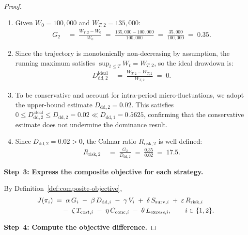 \documentclass[12pt,openany]{book}
\numberwithin{equation}{chapter}
\theoremstyle{plain}
\theoremstyle{definition}
\theoremstyle{remark}
\numberwithin{equation}{chapter}
\theoremstyle{plain}
\begin{document}
\begin{proof}
\begin{enumerate}
  \item Given $W_0 = 100{,}000$ and $W_{T,2} = 135{,}000$:
        \begin{align}
          G_2
          &\;=\; \frac{W_{T,2} - W_0}{W_0}
           \;=\; \frac{135{,}000 - 100{,}000}{100{,}000}
           \;=\; \frac{35{,}000}{100{,}000}
           \;=\; 0.35.
        \end{align}
  \item Since the trajectory is monotonically non-decreasing by
        assumption, the running maximum satisfies
        $\sup_{t \leq T} W_t = W_{T,2}$, so the ideal drawdown is:
        \begin{align}
          D_{\mathrm{dd},2}^{\mathrm{ideal}}
          &\;=\; \frac{W_{T,2} - W_{T,2}}{W_{T,2}}
           \;=\; 0.
        \end{align}
  \item To be conservative and account for intra-period micro-fluctuations,
        we adopt the upper-bound estimate $D_{\mathrm{dd},2} = 0.02$.
        This satisfies $0 \leq D_{\mathrm{dd},2}^{\mathrm{ideal}}
        \leq D_{\mathrm{dd},2} = 0.02 \ll D_{\mathrm{dd},1} = 0.5625$,
        confirming that the conservative estimate does not undermine the
        dominance result.
  \item Since $D_{\mathrm{dd},2} = 0.02 > 0$, the Calmar ratio
        $R_{\mathrm{risk},2}$ is well-defined:
        \begin{align}
          R_{\mathrm{risk},2}
          &\;=\; \frac{G_2}{D_{\mathrm{dd},2}}
           \;=\; \frac{0.35}{0.02}
           \;=\; 17.5.
        \end{align}
\end{enumerate}

\medskip
\noindent\textbf{Step~3: Express the composite objective for each strategy.}

By Definition~\ref{def:composite-objective},
\begin{align}
  J(\pi_i)
  &\;=\; \alpha\,G_i
         \;-\; \beta\,D_{\mathrm{dd},i}
         \;-\; \gamma\,V_i
         \;+\; \delta\,S_{\mathrm{surv},i}
         \;+\; \varepsilon\,R_{\mathrm{risk},i} \notag\\
  &\quad  \;-\; \zeta\,T_{\mathrm{cost},i}
         \;-\; \eta\,C_{\mathrm{conc},i}
         \;-\; \theta\,L_{\mathrm{excess},i},
         \qquad i \in \{1, 2\}.
\end{align}

\medskip
\noindent\textbf{Step~4: Compute the objective difference.}


\end{proof}
\end{document}
